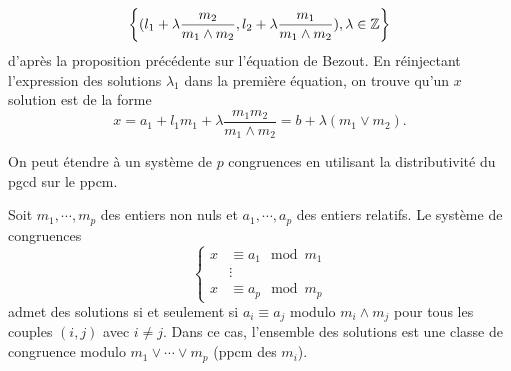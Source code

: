 \begin{demo}
  \begin{displaymath}
    \left \lbrace (l_1 + \lambda \frac{m_2}{m_1 \wedge m_2},l_2 + \lambda \frac{m_1}{m_1 \wedge m_2}), \lambda \in \mathbb{Z} \right\rbrace
  \end{displaymath}
  d'après la proposition précédente sur l'équation de Bezout. En réinjectant l'expression des solutions $\lambda_1$ dans la première équation, on trouve qu'un $x$ solution est de la forme
  \begin{displaymath}
    x = a_1 + l_1 m_1 + \lambda \frac{m_1 m_2}{m_1 \wedge m_2} = b + \lambda (m_1 \vee m_2).
  \end{displaymath}
\end{demo}

On peut étendre à un système de $p$ congruences en utilisant la distributivité du pgcd sur le ppcm.
\begin{propn}\label{SystCong}
  Soit $m_1, \cdots, m_p$ des entiers non nuls et $a_1, \cdots, a_p$ des entiers relatifs. Le système de congruences
  \begin{displaymath}
    \left\lbrace
      \begin{align*}
        x &\equiv a_1 \mod m_1 \\
          &\vdots \\
        x &\equiv a_p \mod m_p
      \end{align*}
    \right.
  \end{displaymath}
  admet des solutions si et seulement si $a_i \equiv a_j$ modulo $m_i \wedge m_j$ pour tous les couples $(i,j)$ avec $i \neq j$. Dans ce cas, l'ensemble des solutions est une classe de congruence modulo $m_1 \vee \cdots \vee m_p$ (ppcm des $m_i$).
\end{propn}
